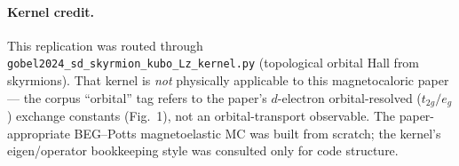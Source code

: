 \documentclass[11pt]{article}
\begin{document}
\paragraph{Kernel credit.} This replication was routed through
\texttt{gobel2024\_sd\_skyrmion\_kubo\_Lz\_kernel.py} (topological orbital Hall
from skyrmions). That kernel is \emph{not} physically applicable to this
magnetocaloric paper --- the corpus ``orbital'' tag refers to the paper's
$d$-electron orbital-resolved ($t_{2g}/e_g$) exchange constants (Fig.~1), not an
orbital-transport observable. The paper-appropriate BEG--Potts magnetoelastic MC
was built from scratch; the kernel's eigen/operator bookkeeping style was
consulted only for code structure.
\end{document}
